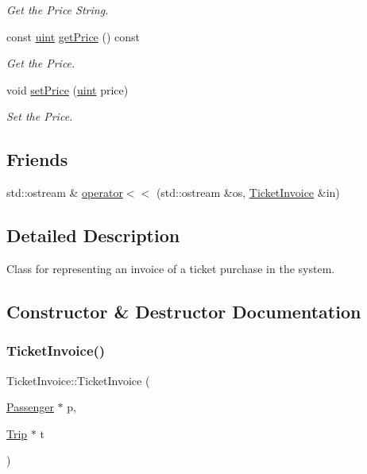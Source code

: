 \begin{DoxyCompactItemize}
\begin{DoxyCompactList}\small\item\em Get the Price String. \end{DoxyCompactList}\item 
const \mbox{\hyperlink{project__utils_8h_a91ad9478d81a7aaf2593e8d9c3d06a14}{uint}} \mbox{\hyperlink{classTicketInvoice_a3758bface685702a6229d617691663e1}{get\+Price}} () const
\begin{DoxyCompactList}\small\item\em Get the Price. \end{DoxyCompactList}\item 
void \mbox{\hyperlink{classTicketInvoice_afeed9962f0276861876a001e372d2063}{set\+Price}} (\mbox{\hyperlink{project__utils_8h_a91ad9478d81a7aaf2593e8d9c3d06a14}{uint}} price)
\begin{DoxyCompactList}\small\item\em Set the Price. \end{DoxyCompactList}\end{DoxyCompactItemize}
\subsection*{Friends}
\begin{DoxyCompactItemize}
\item 
std\+::ostream \& \mbox{\hyperlink{classTicketInvoice_ae78ba81ba79ed7e8c9e8cd23a910f00d}{operator$<$$<$}} (std\+::ostream \&os, \mbox{\hyperlink{classTicketInvoice}{Ticket\+Invoice}} \&in)
\end{DoxyCompactItemize}


\subsection{Detailed Description}
Class for representing an invoice of a ticket purchase in the system. 

\subsection{Constructor \& Destructor Documentation}
\mbox{\label{classTicketInvoice_a38b37e5168ce71bbf37aceef8a6f6267}} 
\subsubsection{\texorpdfstring{Ticket\+Invoice()}{TicketInvoice()}}
{\footnotesize\ttfamily Ticket\+Invoice\+::\+Ticket\+Invoice (\begin{DoxyParamCaption}\item[{\mbox{\hyperlink{classPassenger}{Passenger}} $\ast$}]{p,  }\item[{\mbox{\hyperlink{classTrip}{Trip}} $\ast$}]{t }\end{DoxyParamCaption})}



